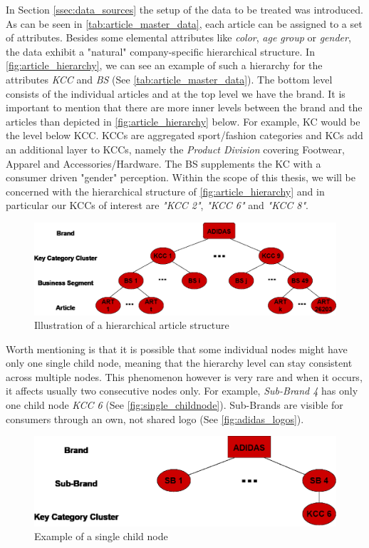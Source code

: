 
In Section \ref{ssec:data_sources} the setup of the data to be treated was introduced. As can be seen in \autoref{tab:article_master_data}, each article can be assigned to a set of attributes. Besides some elemental attributes like \textit{color}, \textit{age group} or \textit{gender}, the data exhibit a "natural" company-specific hierarchical structure. In \autoref{fig:article_hierarchy}, we can see an example of such a hierarchy for the attributes \textit{\ac{KCC}} and \textit{\ac{BS}} (See \autoref{tab:article_master_data}). The bottom level consists of the individual articles and at the top level we have the brand. It is important to mention that there are more inner levels between the brand and the articles than depicted in \autoref{fig:article_hierarchy} below. For example, \ac{KC} would be the level below \ac{KCC}. \acp{KCC} are aggregated sport/fashion categories and \acp{KC} add an additional layer to \acp{KCC}, namely the \textit{Product Division} covering Footwear, Apparel and Accessories/Hardware. The \ac{BS} supplements the \ac{KC} with a consumer driven "gender" perception.
Within the scope of this thesis, we will be concerned with the hierarchical structure of \autoref{fig:article_hierarchy} and in particular our \acp{KCC} of interest are \textit{"KCC 2"}, \textit{"KCC 6"} and \textit{"KCC 8"}.

\begin{figure}[H]
\centering
  \includegraphics[width=0.95\linewidth]{figures/article_tree_KCC_BS.eps}
  \caption{Illustration of a hierarchical article structure}
  \label{fig:article_hierarchy}
\end{figure}

Worth mentioning is that it is possible that some individual nodes might have only one single child node, meaning that the hierarchy level can stay consistent across multiple nodes. This phenomenon however is very rare and when it occurs, it affects usually two consecutive nodes only. For example, \textit{Sub-Brand 4} has only one child node \textit{KCC 6} (See \autoref{fig:single_childnode}). Sub-Brands are visible for consumers through an own, not shared logo (See \autoref{fig:adidas_logos}).\\

\begin{figure}[H]
\centering
  \includegraphics[width=.7\linewidth]{figures/article_tree_single_childnode.eps}
  \caption{Example of a single child node}
  \label{fig:single_childnode}
\end{figure} 










